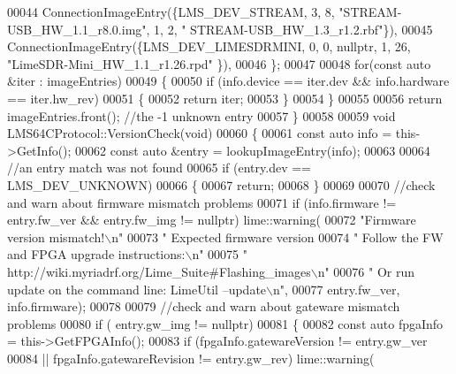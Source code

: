 \begin{DoxyCode}
00044         ConnectionImageEntry(\{LMS_DEV_STREAM,  3, 8, \textcolor{stringliteral}{"STREAM-USB\_HW\_1.1\_r8.0.img"},  1, 2,  \textcolor{stringliteral}{"
      STREAM-USB\_HW\_1.3\_r1.2.rbf"}\}),
00045         ConnectionImageEntry(\{LMS_DEV_LIMESDRMINI,  0, 0, \textcolor{keyword}{nullptr},  1, 26,  \textcolor{stringliteral}{"LimeSDR-Mini\_HW\_1.1\_r1.26.rpd"}
      \}),
00046     \};
00047 
00048     \textcolor{keywordflow}{for}(\textcolor{keyword}{const} \textcolor{keyword}{auto} &iter : imageEntries)
00049     \{
00050         \textcolor{keywordflow}{if} (info.device == iter.dev && info.hardware == iter.hw\_rev)
00051         \{
00052             \textcolor{keywordflow}{return} iter;
00053         \}
00054     \}
00055 
00056     \textcolor{keywordflow}{return} imageEntries.front(); \textcolor{comment}{//the -1 unknown entry}
00057 \}
00058 
00059 \textcolor{keywordtype}{void} LMS64CProtocol::VersionCheck(\textcolor{keywordtype}{void})
00060 \{
00061     \textcolor{keyword}{const} \textcolor{keyword}{auto} info = this->GetInfo();
00062     \textcolor{keyword}{const} \textcolor{keyword}{auto} &entry = lookupImageEntry(info);
00063 
00064     \textcolor{comment}{//an entry match was not found}
00065     \textcolor{keywordflow}{if} (entry.dev == LMS_DEV_UNKNOWN)
00066     \{
00067         \textcolor{keywordflow}{return};
00068     \}
00069 
00070     \textcolor{comment}{//check and warn about firmware mismatch problems}
00071     \textcolor{keywordflow}{if} (info.firmware != entry.fw\_ver && entry.fw\_img != \textcolor{keyword}{nullptr}) lime::warning(
00072         \textcolor{stringliteral}{"Firmware version mismatch!\(\backslash\)n"}
00073         \textcolor{stringliteral}{"  Expected firmware version %
00074         \textcolor{stringliteral}{"  Follow the FW and FPGA upgrade instructions:\(\backslash\)n"}
00075         \textcolor{stringliteral}{"  http://wiki.myriadrf.org/Lime\_Suite#Flashing\_images\(\backslash\)n"}
00076         \textcolor{stringliteral}{"  Or run update on the command line: LimeUtil --update\(\backslash\)n"},
00077         entry.fw\_ver, info.firmware);
00078 
00079     \textcolor{comment}{//check and warn about gateware mismatch problems}
00080     \textcolor{keywordflow}{if} ( entry.gw\_img != \textcolor{keyword}{nullptr})
00081     \{
00082         \textcolor{keyword}{const} \textcolor{keyword}{auto} fpgaInfo = this->GetFPGAInfo();
00083         \textcolor{keywordflow}{if} (fpgaInfo.gatewareVersion != entry.gw\_ver
00084             || fpgaInfo.gatewareRevision != entry.gw\_rev) lime::warning(
}
\end{DoxyCode}
